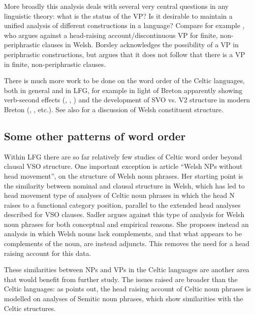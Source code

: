 \documentclass[output=paper,colorlinks,citecolor=brown]{langscibook}
\begin{document}
More broadly this analysis deals with several very central questions in any linguistic theory: what is the status of the VP? Is it desirable to maintain a unified analysis of different constructions in a language? Compare for example \citet{Borsley2006}, who argues against a head-raising account/discontinuous VP for finite, non-periphrastic clauses in Welsh. Borsley acknowledges the possibility of a VP in periphrastic constructions, but argues that it does not follow that there is a VP in finite, non-periphrastic clauses.

There is much more work to be done on the word order of the Celtic languages, both in general and in LFG, for example in light of Breton apparently showing verb-second effects (\citealt{Schafer1995}, \citealt[22]{Tallerman1998}, \citealt[400]{Stephens2002}) and the development of SVO vs. V2 structure in modern Breton (\citealt{Timm1989}, \citealt{Kennard2014}, etc.). See also \citet[1779--1783]{Sadler2006} for a discussion of Welsh constituent structure.

\subsection{Some other patterns of word order}
\label{sec:Celtic:2.3}

Within LFG there are so far relatively few studies of Celtic word order beyond clausal VSO structure. One important exception is  article ``Welsh NPs without head movement'', on the structure of Welsh noun phrases. Her starting point is the similarity between nominal and clausal structure in Welsh, which has led to head movement type of analyses of Celtic noun phrases in which the head N raises to a functional category position, parallel to the extended head analyses described for VSO clauses. Sadler argues against this type of analysis for Welsh noun phrases for both conceptual and empirical reasons. She proposes instead an analysis in which Welsh nouns lack complements, and that what appears to be complements of the noun, are instead adjuncts. This removes the need for a head raising account for this data.

These similarities between NPs and VPs in the Celtic languages are another area that would benefit from further study. The issues raised are broader than the Celtic languages: as \citet[2]{Sadler1998} points out, the head raising account of Celtic noun phrases is modelled on analyses of Semitic noun phrases, which show similarities with the Celtic structures.
\end{document}
